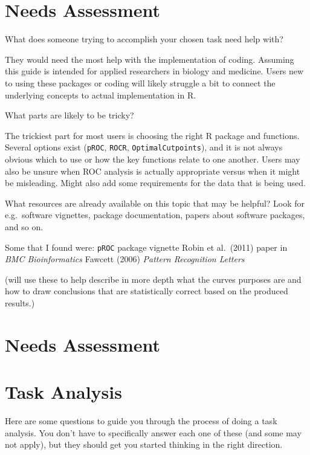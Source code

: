 \documentclass[
  letterpaper,
  DIV=11,
  numbers=noendperiod]{scrreprt}
\begin{document}
\chapter{Needs Assessment}\label{needs-assessment}

What does someone trying to accomplish your chosen task need help with?

They would need the most help with the implementation of coding.
Assuming this guide is intended for applied researchers in biology and
medicine. Users new to using these packages or coding will likely
struggle a bit to connect the underlying concepts to actual
implementation in R.

What parts are likely to be tricky?

The trickiest part for most users is choosing the right R package and
functions. Several options exist (\texttt{pROC}, \texttt{ROCR},
\texttt{OptimalCutpoints}), and it is not always obvious which to use or
how the key functions relate to one another. Users may also be unsure
when ROC analysis is actually appropriate versus when it might be
misleading. Might also add some requirements for the data that is being
used.

What resources are already available on this topic that may be helpful?
Look for e.g.~software vignettes, package documentation, papers about
software packages, and so on.

Some that I found were: \texttt{pROC} package vignette Robin et
al.~(2011) paper in \emph{BMC Bioinformatics} Fawcett (2006)
\emph{Pattern Recognition Letters}

(will use these to help describe in more depth what the curves purposes
are and how to draw conclusions that are statistically correct based on
the produced results.)

\chapter{Needs Assessment}\label{needs-assessment-1}

\chapter{Task Analysis}\label{task-analysis}

Here are some questions to guide you through the process of doing a task
analysis. You don't have to specifically answer each one of these (and
some may not apply), but they should get you started thinking in the
right direction.
\end{document}
